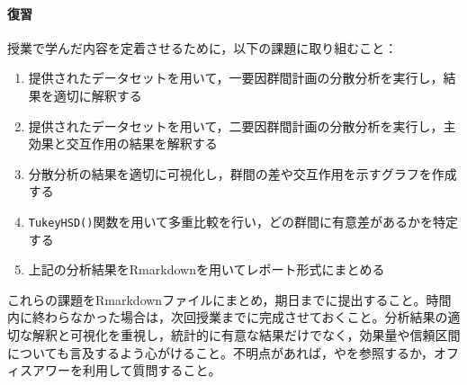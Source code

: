 \paragraph{復習}
授業で学んだ内容を定着させるために，以下の課題に取り組むこと：

\begin{enumerate}
\item 提供されたデータセットを用いて，一要因群間計画の分散分析を実行し，結果を適切に解釈する
\item 提供されたデータセットを用いて，二要因群間計画の分散分析を実行し，主効果と交互作用の結果を解釈する
\item 分散分析の結果を適切に可視化し，群間の差や交互作用を示すグラフを作成する
\item \verb|TukeyHSD()|関数を用いて多重比較を行い，どの群間に有意差があるかを特定する
\item 上記の分析結果をRmarkdownを用いてレポート形式にまとめる
\end{enumerate}

これらの課題をRmarkdownファイルにまとめ，期日までに提出すること。時間内に終わらなかった場合は，次回授業までに完成させておくこと。分析結果の適切な解釈と可視化を重視し，統計的に有意な結果だけでなく，効果量や信頼区間についても言及するよう心がけること。不明点があれば，\textcite{kosugi2019}や\textcite{Hashimoto201607}を参照するか，オフィスアワーを利用して質問すること。